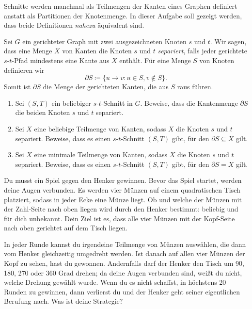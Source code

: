 \documentclass{uebung_cs}
\begin{document}
\begin{exercise}
    Schnitte werden manchmal als Teilmengen der Kanten eines Graphen definiert anstatt als Partitionen der Knotenmenge.
    In dieser Aufgabe soll gezeigt werden, dass beide Definitionen \emph{nahezu} äquivalent sind.
  
    Sei $G$ ein gerichteter Graph mit zwei ausgezeichneten Knoten $s$ und $t$. Wir sagen, dass eine Menge $X$ von Kanten die Knoten $s$ und $t$ \emph{separiert}, falls jeder gerichtete $s$-$t$-Pfad mindestens eine Kante aus $X$ enthält.
    Für eine Menge $S$ von Knoten definieren wir
    \[\partial S \coloneqq \{u \to v : u \in S, v \not\in S\}.\]
    Somit ist $\partial S$ die Menge der gerichteten Kanten, die aus $S$ raus führen.
  
    \begin{enumerate}
      \item Sei $(S,T)$ ein beliebiger $s$-$t$-Schnitt in $G$. Beweise, dass die Kantenmenge $\partial S$ die beiden Knoten $s$ und $t$ separiert.
      \item Sei $X$ eine beliebige Teilmenge von Kanten, sodass $X$ die Knoten $s$ und $t$ separiert.
      Beweise, dass es einen $s$-$t$-Schnitt $(S,T)$ gibt, für den $\partial S \subseteq X$ gilt.
      \item Sei $X$ eine minimale Teilmenge von Kanten, sodass $X$ die Knoten $s$ und $t$ separiert.
      Beweise, dass es einen $s$-$t$-Schnitt $(S,T)$ gibt, für den $\partial S = X$ gilt.
    \end{enumerate}
  \end{exercise}
  
\begin{exercise}
    Du musst ein Spiel gegen den Henker gewinnen. Bevor das Spiel startet, werden deine Augen verbunden. Es werden vier Münzen auf einem quadratischen Tisch platziert, sodass in jeder Ecke eine Münze liegt. Ob und welche der Münzen mit der Zahl-Seite nach oben liegen wird durch den Henker bestimmt: beliebig und für dich unbekannt. Dein Ziel ist es, dass alle vier Münzen mit der Kopf-Seite nach oben gerichtet auf dem Tisch liegen.
    
    In jeder Runde kannst du irgendeine Teilmenge von Münzen auswählen, die dann vom Henker gleichzeitig umgedreht werden. Ist danach auf allen vier Münzen der Kopf zu sehen, hast du gewonnen. Andernfalls darf der Henker den Tisch um 90, 180, 270 oder 360 Grad drehen; da deine Augen verbunden sind, weißt du nicht, welche Drehung gewählt wurde. Wenn du es nicht schaffst, in höchstens 20 Runden zu gewinnen, dann verlierst du und der Henker geht seiner eigentlichen Berufung nach. Was ist deine Strategie?
\end{exercise}
\end{document}
